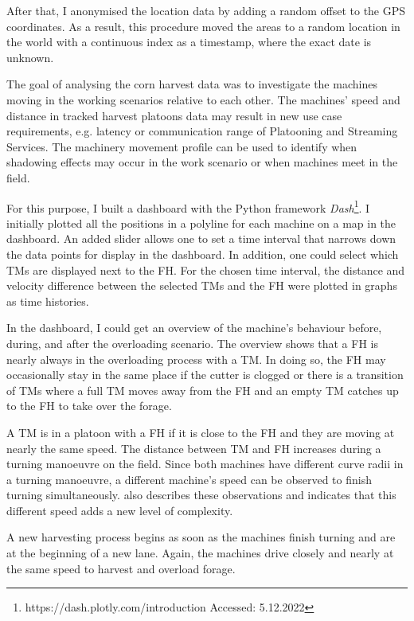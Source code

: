 After that, I anonymised the location data by adding a random offset to the GPS coordinates. As a result, this procedure moved the areas to a random location in the world with a continuous index as a timestamp, where the exact date is unknown.

The goal of analysing the corn harvest data was to investigate the machines moving in the working scenarios relative to each other. The machines' speed and distance in tracked harvest platoons data may result in new use case requirements, e.g. latency or communication range of Platooning and Streaming Services. The machinery movement profile can be used to identify when shadowing effects may occur in the work scenario or when machines meet in the field.

For this purpose, I built a dashboard with the Python framework \textit{Dash}\footnote{https://dash.plotly.com/introduction Accessed: 5.12.2022}. I initially plotted all the positions in a polyline for each machine
on a map in the dashboard. An added slider allows one to set a time interval that narrows down the data points for display in the dashboard. In addition, one could select which \ac{TM}s are displayed next to the \ac{FH}. For the chosen time interval, the distance and velocity difference between the selected \ac{TM}s and the \ac{FH} were plotted in graphs as time histories.

In the dashboard, I could get an overview of the machine's behaviour 
before, during, and after the overloading scenario.
The overview shows that a \ac{FH} is nearly always in the overloading process with a \ac{TM}. In doing so, the \ac{FH} may occasionally stay in the same place if the cutter is clogged or there is a transition of \ac{TM}s where a full \ac{TM} moves away from the \ac{FH} and an empty \ac{TM} catches up to the \ac{FH} to take over the forage.

A \ac{TM} is in a platoon with a \ac{FH} if it is close to the \ac{FH} and they are moving at nearly the same speed. The distance between \ac{TM} and \ac{FH} increases during a turning manoeuvre on the field. Since both machines have different curve radii in a turning manoeuvre, a different machine's speed can be observed to finish turning simultaneously.
\textcite{smolnik_5g_2020} also describes these observations and indicates that this different speed adds a new level of complexity.

A new harvesting process begins as soon as the machines finish turning and are at the beginning of a new lane.
Again, the machines drive closely and nearly at the same speed to harvest and overload forage.

